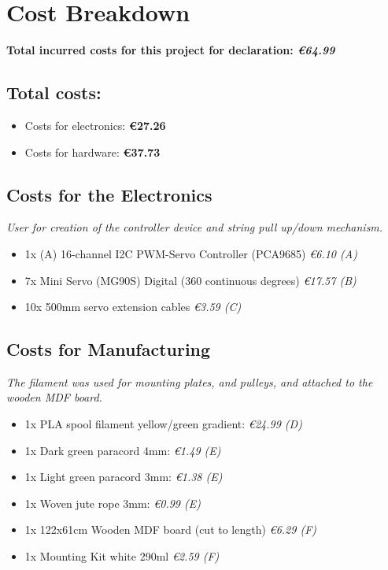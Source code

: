 \documentclass[a4paper]{article}
\begin{document}
\section*{Cost Breakdown}

\textbf{Total incurred costs for this project for declaration: \textit{€64.99}}

\subsection*{Total costs:}
\begin{itemize}
    \item Costs for electronics: \textbf{€27.26}
    \item Costs for hardware: \textbf{€37.73}
\end{itemize}

\subsection*{Costs for the Electronics}

\textit{User for creation of the controller device and string pull up/down mechanism.}

\begin{itemize}
    \item 1x \texti(A) 16-channel I2C PWM-Servo Controller (PCA9685) \textit{€6.10 (A)}
    \item 7x Mini Servo (MG90S) Digital (360 continuous degrees) \textit{€17.57 (B)}
    \item 10x 500mm servo extension cables \textit{€3.59 (C)}

\end{itemize}

\subsection*{Costs for Manufacturing}

\textit{The filament was used for mounting plates, and pulleys, and attached to the wooden MDF board.}

\begin{itemize}
    \item 1x PLA spool filament yellow/green gradient: \textit{€24.99 (D)}
    \item 1x Dark green paracord 4mm: \textit{€1.49 (E)} 
    \item 1x Light green paracord 3mm: \textit{€1.38 (E)} 
    \item 1x Woven jute rope 3mm: \textit{€0.99 (E)} 
    \item 1x 122x61cm Wooden MDF board (cut to length) \textit{€6.29 (F)} 
    \item 1x Mounting Kit white 290ml \textit{€2.59 (F)} 
\end{itemize}
\end{document}
